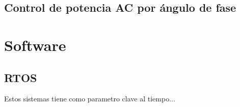 \subsection{Control de potencia AC por ángulo de fase}



\section{Software}

\subsection{RTOS}

\cite{SO} Estos sistemas tiene como parametro clave al tiempo...

